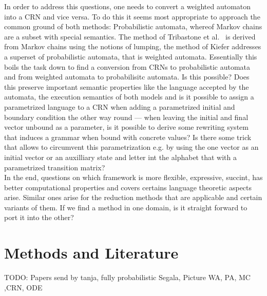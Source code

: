 \documentclass[11pt, rgb]{scrartcl}
\begin{document}
In order to address this questions, one needs to convert a weighted automaton into a CRN and vice versa. To do this it seems most appropriate to approach the common ground of both methods: Probabilistic automata, whereof Markov chains are a subset with special semantics. The method of Tribastone et al.~\autocite{Cardelli2017MaximalAO} is derived from Markov chains using the notions of lumping, the method of Kiefer addresses a superset of probabilistic automata, that is weighted automata. Essentially this boils the task down to find a conversion from CRNs to probabilistic automata and from weighted automata to probabilisitc automata. Is this possible? Does this preserve important semantic properties like the language accepted by the automata, the execution semantics of both models and is it possible to assign a parametrized language to a CRN when adding a parametrized initial and boundary condition the other way round --- when leaving the initial and final vector unbound as a parameter, is it possible to derive some rewriting system that induces a grammar when bound with concrete values? Is there some trick that allows to circumvent this parametrization e.g. by using the one vector as an initial vector or an auxilliary state and letter int the alphabet that with a parametrized transition matrix? \\

In the end, questions on which framework is more flexible, expressive, succint, has better computational properties and covers certains language theoretic aspects arise. Similar ones arise for the reduction methods that are applicable and certain variants of them. If we find a method in one domain, is it straight forward to port it into the other?


\section{Methods and Literature}

TODO: Papers send by tanja, fully probabilistic Segala, Picture WA, PA, MC ,CRN, ODE





\printbibliography
\end{document}
